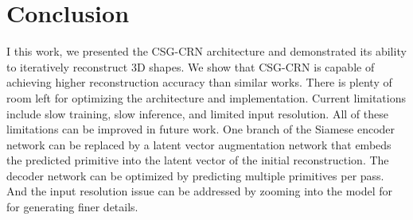 
\chapter{Conclusion}
\label{chap:conclusion}

I this work, we presented the CSG-CRN architecture and demonstrated its ability to iteratively reconstruct 3D shapes. We show that CSG-CRN is capable of achieving higher reconstruction accuracy than similar works. There is plenty of room left for optimizing the architecture and implementation. Current limitations include slow training, slow inference, and limited input resolution. All of these limitations can be improved in future work. One branch of the Siamese encoder network can be replaced by a latent vector augmentation network that embeds the predicted primitive into the latent vector of the initial reconstruction. The decoder network can be optimized by predicting multiple primitives per pass. And the input resolution issue can be addressed by zooming into the model for for generating finer details.